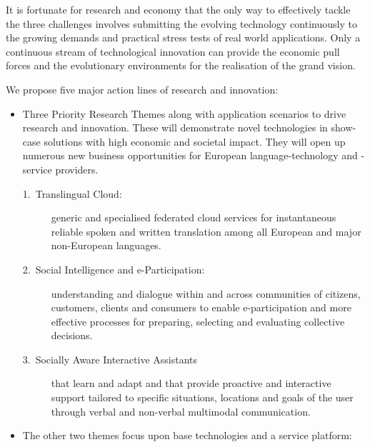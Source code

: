 \documentclass[output=paper]{LSP/langsci}
\begin{document}
It is fortunate for research and economy that the only way to
effectively tackle the three challenges involves submitting the
evolving technology continuously to the growing demands and practical
stress tests of real world applications. Only a continuous stream of
technological innovation can provide the economic pull forces and the
evolutionary environments for the realisation of the grand vision.

We propose five major action lines of research and innovation:

\begin{itemize}
\sloppy
\item Three Priority Research Themes along with application
  scenarios to drive research and innovation. These will demonstrate
  novel technologies in show-case solutions with high economic and
  societal impact. They will open up numerous new business
  opportunities for European language-technology and -service
  providers.
  \begin{description}
  \item[1.~Translingual Cloud:] generic and specialised federated
    cloud services for instantaneous reliable spoken and written
    translation among all European and major non-European languages.
  \item[2.~Social Intelligence and e-Participation:]
    understanding and dialogue within and across communities of
    citizens, customers, clients and consumers to enable
    e-participation and more effective processes for preparing,
    selecting and evaluating collective decisions.
  \item[3.~Socially Aware Interactive Assistants] that learn and
    adapt and that provide proactive and interactive support tailored
    to specific situations, locations and goals of the user through
    verbal and non-verbal multimodal communication.
  \end{description}
\item The other two themes focus upon base technologies and a service platform:
\end{itemize}
\end{document}
